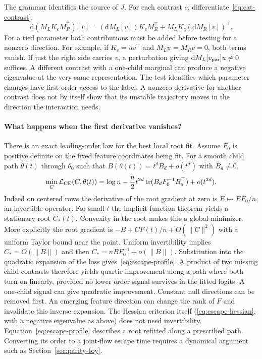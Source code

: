 The grammar identifies the source of $J$. For each contrast $c$,
differentiate~\eqref{eq:cat-contrast}:
\[
 \mathrm d (M_LK_cM_R^\top)[v]
 =(\mathrm dM_L[v])K_cM_R^\top
  +M_LK_c(\mathrm dM_R[v])^\top.
\]
For a tied parameter both contributions must be added before testing
for a nonzero direction. For example, if $K_c=uv^\top$ and
$M_Lu=M_Rv=0$, both terms vanish. If just the right side carries $v$,
a perturbation giving $\mathrm dM_L[v_{\rm par}]u\ne0$ suffices.
A different contrast with a one-child marginal can produce a negative
eigenvalue at the very same representation. The test identifies which
parameter changes have first-order access to the label. A nonzero
derivative for another contrast does not by itself show that its
unstable trajectory moves in the direction the interaction needs.

\paragraph{What happens when the first derivative vanishes?}
There is an exact leading-order law for the best local root fit.
Assume $F_0$ is positive definite on the fixed feature coordinates being
fit. For a smooth child path $\theta(t)$ through $\theta_0$ such that
$B(\theta(t))=t^d B_d+o(t^d)$ with $B_d\ne0$,
\begin{equation}
 \min_C \mathcal L_{\rm CE}(C,\theta(t))
 =\log n-\frac{n}{2}t^{2d}
 \operatorname{tr}(B_d F_0^{-1} B_d^\top)+o(t^{2d}).
 \label{eq:escape-profile}
\end{equation}
Indeed on centered rows the derivative of the root gradient at zero is
$E\mapsto EF_0/n$, an invertible operator. For small $t$ the implicit
function theorem yields a stationary root $C_*(t)$. Convexity in the
root makes this a global minimizer. More explicitly the root gradient
is $-B+C F(t)/n+O(\|C\|^2)$ with a uniform Taylor bound near the
point. Uniform invertibility implies $C_*=O(\|B\|)$ and then
$C_*=n B F_0^{-1}+o(\|B\|)$. Substitution into the quadratic expansion
of the loss gives~\eqref{eq:escape-profile}.
A product of two missing child contrasts therefore yields quartic
improvement along a path where both turn on linearly, provided no lower
order signal survives in the fitted logits. A one-child signal can give
quadratic improvement. Constant null directions can be removed first.
An emerging feature direction can change the rank of $F$ and invalidate
this inverse expansion. The Hessian criterion itself
(\eqref{eq:escape-hessian}, with a negative eigenvalue as above) does
not need invertibility. Equation~\eqref{eq:escape-profile} describes a
root refitted along a prescribed path. Converting its order to a joint-flow
escape time requires a dynamical argument such as Section~\ref{sec:parity-toy}.

